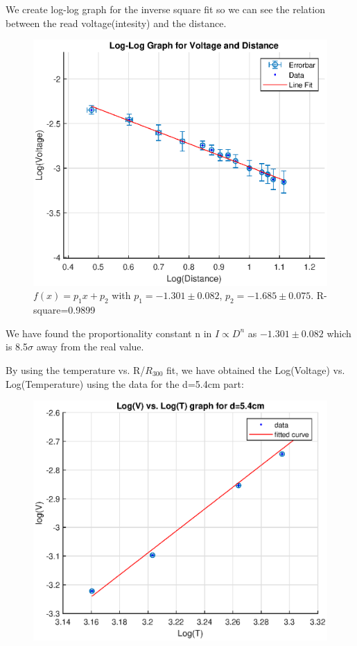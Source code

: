 \documentclass[10pt,a4paper]{article}
\begin{document}
{\par We create log-log graph for the inverse square fit so we can see the relation between the read voltage(intesity) and the distance.
\begin{figure}[H]
	\advance{}
	\includegraphics[scale=0.7]{ISLlog.eps}	
	\caption{$f(x) = p_1x+p_2$ with $p_1=-1.301 \pm0.082$, $p_2=-1.685\pm0.075$. R-square=0.9899}
\end{figure}
\par We have found the proportionality constant n in $I\propto D^n$ as $-1.301 \pm0.082$ which is 8.5$\sigma$ away from the real value.
\par By using the temperature vs. R/$R_{300}$ fit, we have obtained the Log(Voltage) vs. Log(Temperature) using the data for the d=5.4cm part:
\begin{figure}[H]
\advance{}
\includegraphics[scale=0.7]{d1high.eps}

\end{figure}}
\end{document}
